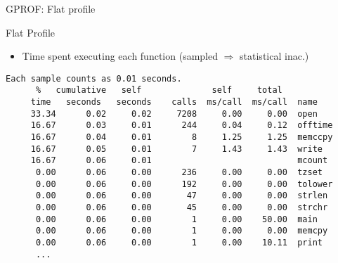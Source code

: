 \documentclass[10pt,xcolor=table]{beamer}
\begin{document}
\begin{frame}[fragile]{GPROF: Flat profile}

  \begin{block}{Flat Profile}
    \begin{itemize}
    \item Time spent executing each function {\small (sampled
        $\Rightarrow$ statistical inac.)}
    \end{itemize}
  \end{block}

  \vspace*{-1cm}

  \begin{lstlisting}[gobble=3, caption={Flat profile example}]
    Each sample counts as 0.01 seconds.
      %   cumulative   self              self     total
     time   seconds   seconds    calls  ms/call  ms/call  name
     33.34      0.02     0.02     7208     0.00     0.00  open
     16.67      0.03     0.01      244     0.04     0.12  offtime
     16.67      0.04     0.01        8     1.25     1.25  memccpy
     16.67      0.05     0.01        7     1.43     1.43  write
     16.67      0.06     0.01                             mcount
      0.00      0.06     0.00      236     0.00     0.00  tzset
      0.00      0.06     0.00      192     0.00     0.00  tolower
      0.00      0.06     0.00       47     0.00     0.00  strlen
      0.00      0.06     0.00       45     0.00     0.00  strchr
      0.00      0.06     0.00        1     0.00    50.00  main
      0.00      0.06     0.00        1     0.00     0.00  memcpy
      0.00      0.06     0.00        1     0.00    10.11  print
      ...
  \end{lstlisting}

\end{frame}
\end{document}
